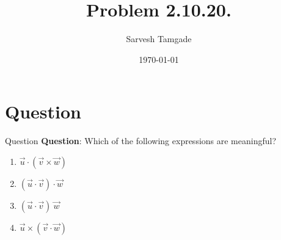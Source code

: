 \documentclass{beamer}
\title{Problem 2.10.20.}
\author{Sarvesh Tamgade}
\date{\today}
\theoremstyle{remark}
\numberwithin{equation}{section}
\begin{document}
\begin{frame}
\titlepage
\end{frame}

\section{Question}
\begin{frame}{Question}
\textbf{Question}:
 Which of the following expressions are meaningful?
\begin{multicols}{2}
\begin{enumerate}[label=(\alph*)]
     
\item $\vec{u} \cdot (\vec{v} \times \vec{w})$
\item $(\vec{u} \cdot \vec{v}) \cdot \vec{w}$
\item $(\vec{u} \cdot \vec{v})\ \vec{w}$
\item $\vec{u} \times (\vec{v} \cdot \vec{w})$

\end{enumerate}
\end{multicols}
\end{frame}
\end{document}

